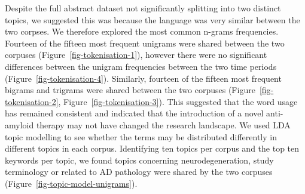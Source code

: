 \documentclass[
  a4paper,
]{article}
\begin{document}
Despite the full abstract dataset not significantly splitting into two
distinct topics, we suggested this was because the language was very
similar between the two corpses. We therefore explored the most common
n-grams frequencies. Fourteen of the fifteen most frequent unigrams were
shared between the two corpuses (Figure~\ref{fig-tokenisation-1}),
however there were no significant differences between the unigram
frequencies between the two time periods
(Figure~\ref{fig-tokenisation-4}). Similarly, fourteen of the fifteen
most frequent bigrams and trigrams were shared between the two corpuses
(Figure~\ref{fig-tokenisation-2}, Figure~\ref{fig-tokenisation-3}). This
suggested that the word usage has remained consistent and indicated that
the introduction of a novel anti-amyloid therapy may not have changed
the research landscape. We used LDA topic modelling to see whether the
terms may be distributed differently in different topics in each corpus.
Identifying ten topics per corpus and the top ten keywords per topic, we
found topics concerning neurodegeneration, study terminology or related
to AD pathology were shared by the two corpuses
(Figure~\ref{fig-topic-model-unigrams}).
\end{document}
